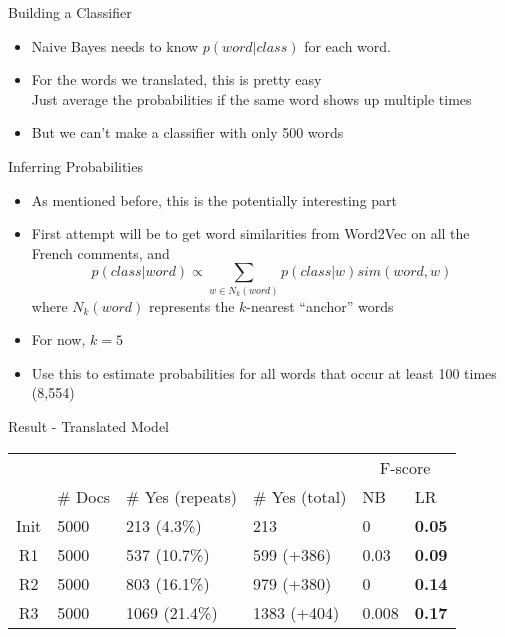 \documentclass{beamer}
\begin{document}
\begin{frame}{Building a Classifier}
\begin{itemize}
\item Naive Bayes needs to know $p(word| class)$ for each word. 
\item For the words we translated, this is pretty easy \\
Just average the probabilities if the same word shows up multiple times
\item But we can't make a classifier with only 500 words
\end{itemize}
\end{frame}

\begin{frame}{Inferring Probabilities}
\begin{itemize}
\item As mentioned before, this is the potentially interesting part
\item First attempt will be to get word similarities from Word2Vec on all the French comments, and
\[ p(class|word) \propto \sum_{w\in N_k(word)} p(class|w) sim(word,w) \]
where $N_k(word)$ represents the $k$-nearest ``anchor'' words
\item For now, $k=5$
\item Use this to estimate probabilities for all words that occur at least 100 times (8,554)
\end{itemize}
\end{frame}

\begin{frame}{Result - Translated Model}
\begin{center}
\begin{tabular}{|c|l|l|l|l|l|}
\rowcolor{gray!50} &&&& \multicolumn{2}{|c|}{F-score} \\
\rowcolor{gray!50} & \# Docs & \# Yes (repeats) & \# Yes (total) & NB & LR \\
Init & 5000 & 213 (4.3\%) & 213 & 0 & \textbf{0.05} \\
R1 & 5000 &  537 (10.7\%) & 599 (+386)& 0.03 & \textbf{0.09} \\
R2 & 5000 &  803 (16.1\%) & 979 (+380)& 0 & \textbf{0.14} \\
R3 & 5000 & 1069 (21.4\%) & 1383 (+404)& 0.008 & \textbf{0.17} \\
\end{tabular}\end{center}
\end{frame}
\end{document}
